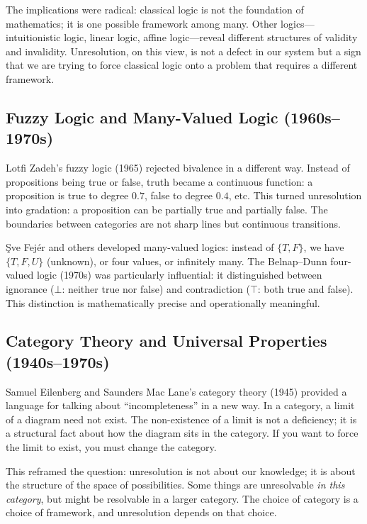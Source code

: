 \documentclass[11pt,letterpaper]{article}
\theoremstyle{definition}
\theoremstyle{remark}
\begin{document}
The implications were radical: classical logic is not the foundation of mathematics; it is one possible framework among many. Other logics---intuitionistic logic, linear logic, affine logic---reveal different structures of validity and invalidity. Unresolution, on this view, is not a defect in our system but a sign that we are trying to force classical logic onto a problem that requires a different framework.

\subsection{Fuzzy Logic and Many-Valued Logic (1960s--1970s)}

Lotfi Zadeh's fuzzy logic (1965) rejected bivalence in a different way. Instead of propositions being true or false, truth became a continuous function: a proposition is true to degree $0.7$, false to degree $0.4$, etc. This turned unresolution into gradation: a proposition can be partially true and partially false. The boundaries between categories are not sharp lines but continuous transitions.

\c{S}ve Fej\'er and others developed many-valued logics: instead of $\{T, F\}$, we have $\{T, F, U\}$ (unknown), or four values, or infinitely many. The Belnap--Dunn four-valued logic (1970s) was particularly influential: it distinguished between ignorance ($\bot$: neither true nor false) and contradiction ($\top$: both true and false). This distinction is mathematically precise and operationally meaningful.

\subsection{Category Theory and Universal Properties (1940s--1970s)}

Samuel Eilenberg and Saunders Mac Lane's category theory (1945) provided a language for talking about ``incompleteness'' in a new way. In a category, a limit of a diagram need not exist. The non-existence of a limit is not a deficiency; it is a structural fact about how the diagram sits in the category. If you want to force the limit to exist, you must change the category.

This reframed the question: unresolution is not about our knowledge; it is about the structure of the space of possibilities. Some things are unresolvable \emph{in this category}, but might be resolvable in a larger category. The choice of category is a choice of framework, and unresolution depends on that choice.
\end{document}
